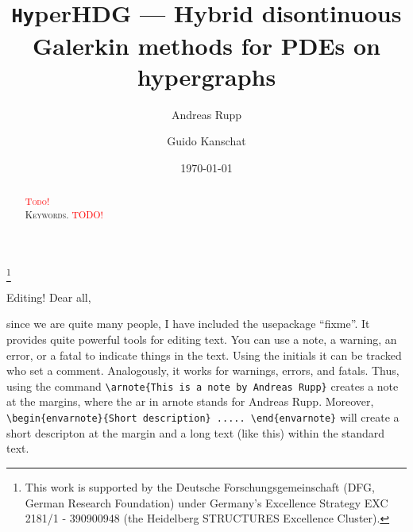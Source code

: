 \documentclass[a4paper, english, 12pt, reqno, draft]{amsart}
\theoremstyle{definition}
\theoremstyle{remark}
\numberwithin{equation}{section}
\newcommand{\hyperHDG}{{\fontfamily{pzc}\selectfont \texttt{Hy}\hspace{-1.5pt}perHDG }}
\begin{document}
\title[\hyperHDG --- HDG on hypergraphs]{\hyperHDG --- Hybrid disontinuous Galerkin methods for PDEs on hypergraphs} 

\author{Andreas Rupp}
\address{Interdisciplinary Center for Scientific Computing (IWR), Heidelberg University, Mathematikon, Im Neuenheimer Feld 205, 69120 Heidelberg, Germany}
\thanks{This work is supported by the Deutsche Forschungsgemeinschaft (DFG, German Research Foundation) under Germany's Excellence Strategy EXC 2181/1 - 390900948 (the Heidelberg STRUCTURES Excellence Cluster).}

\author{Guido Kanschat}
\address{Interdisciplinary Center for Scientific Computing (IWR) and Mathematics Center Heidelberg (MATCH), Heidelberg University, Mathematikon, Im Neuenheimer Feld 205, 69120 Heidelberg, Germany}

\subjclass[2010]{\textcolor{red}{TODO}}

\date{\today}


\begin{abstract}
 \textcolor{red}{\textsc{Todo!}} 
 \\[1ex] \noindent \textsc{Keywords.}
 \textcolor{red}{TODO!}
\end{abstract}
% 
\allowdisplaybreaks
\maketitle
% 

\begin{envarnote}{Editing!}
 Dear all,
 
 since we are quite many people, I have included the usepackage ``fixme''. It provides quite powerful tools for editing text. You can use a note, a warning, an error, or a fatal to indicate things in the text. Using the initials it can be tracked who set a comment. Analogously, it works for warnings, errors, and fatals. Thus, using the command \verb|\arnote{This is a note by Andreas Rupp}| creates a note at the margins, where the ar in arnote stands for Andreas Rupp. Moreover, \verb|\begin{envarnote}{Short description} ..... \end{envarnote}| \linebreak will create a short descripton at the margin and a long text (like this) within the standard text.
\end{envarnote}
% 
\end{document}
